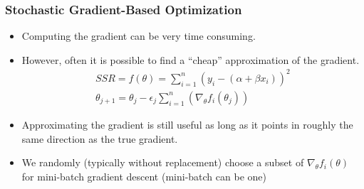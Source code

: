 \documentclass[
  shownotes,
  xcolor={svgnames},
  hyperref={colorlinks,citecolor=DarkBlue,linkcolor=DarkRed,urlcolor=DarkBlue}
  , aspectratio=169]{beamer}
\begin{document}
\begin{frame}[fragile]
\frametitle{Stochastic Gradient-Based Optimization}

\begin{itemize}
  \item Computing the gradient can be very time consuming. 
  \item However, often it is possible to find a “cheap” approximation of the gradient. 
\begin{align}
  SSR=f(\theta)=\sum_{i=1}^{n}(y_{i}-(\alpha+\beta x_{i}))^{2} \nonumber \\
\theta_{j+1}=\theta_j -\epsilon_j \sum_{i=1}^n(\nabla_{\theta} f_i(\theta_j))\nonumber 
\end{align}


\item Approximating the gradient is still useful as long as it points in roughly the same direction as the true gradient.
\item We randomly (typically without replacement) choose a subset of $\nabla_{\theta} f_i(\theta)$ for mini-batch gradient descent (mini-batch can be one)

\end{itemize}

 \end{frame}
\end{document}
